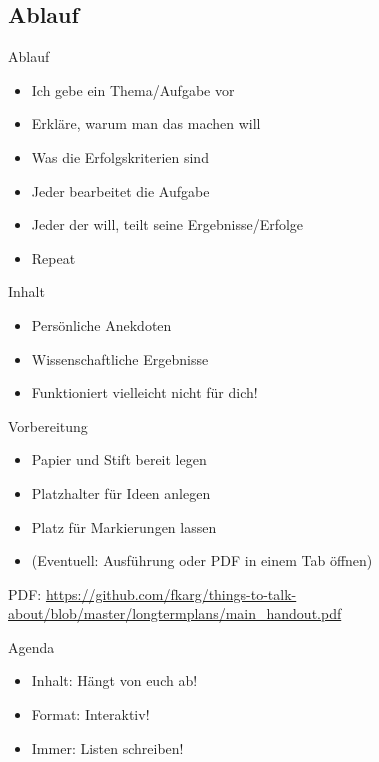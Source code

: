 \subsection{Ablauf}


\begin{frame}[c]{Ablauf}
    \begin{itemize}[<+(1)->]
        \item Ich gebe ein Thema/Aufgabe vor
        \item Erkläre, warum man das machen will
        \item Was die Erfolgskriterien sind
        \item Jeder bearbeitet die Aufgabe
        \item Jeder der will, teilt seine Ergebnisse/Erfolge
        \item Repeat
    \end{itemize}
\end{frame}


\begin{frame}[c]{Inhalt}
    \large
    \begin{itemize}[<+(1)->]
        \item Persönliche Anekdoten
        \item Wissenschaftliche Ergebnisse
        \item Funktioniert vielleicht nicht für dich!
    \end{itemize}
\end{frame}


\begin{frame}[c]{Vorbereitung}
    \begin{itemize}[<+(1)->]
        \item Papier und Stift bereit legen
        \item Platzhalter für Ideen anlegen
        \item Platz für Markierungen lassen
        \item (Eventuell: Ausführung \cite{longtermplans-post} oder PDF \cite{longtermplans-pdf} in einem Tab öffnen)
    \end{itemize}
    \pause
    PDF: \url{https://github.com/fkarg/things-to-talk-about/blob/master/longtermplans/main_handout.pdf}
\end{frame}


\begin{frame}[c]{Agenda}
    \large
    \begin{itemize}[<+(1)->]
        \item Inhalt: Hängt von euch ab!
        \item Format: Interaktiv!
        \item Immer: Listen schreiben!
    \end{itemize}
\end{frame}


%
%
